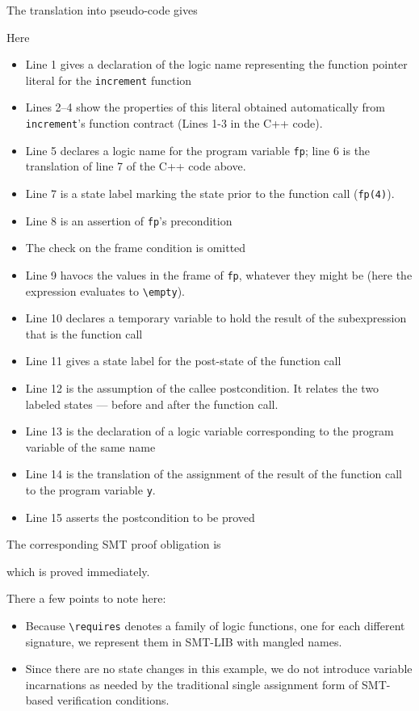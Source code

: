 The translation into pseudo-code gives


Here
\begin{itemize}[noitemsep,nolistsep]
	\item Line 1 gives a declaration of the logic name representing 
	the function pointer literal for the \lstinline|increment| function
	\item Lines 2--4 show the properties of this literal obtained
	automatically from \lstinline|increment|'s function contract
	(Lines 1-3 in the C++ code).
	\item Line 5 declares a logic name for the program variable 
	\lstinline|fp|; line 6 is the translation of line 7 of the C++ code above.
	\item Line 7 is a state label marking the state prior to the 
	function call (\lstinline|fp(4)|).
	\item Line 8 is an assertion of \lstinline|fp|'s precondition
	\item The check on the frame condition is omitted
	\item Line 9 havocs the values in the frame of \lstinline|fp|,
	whatever they might be (here the expression evaluates to 
	\lstinline|\empty|).
	\item Line 10 declares a temporary variable to hold the result of
	the subexpression that is the function call
	\item Line 11 gives a state label for the post-state of the function call
	\item Line 12 is the assumption of the callee postcondition. It relates the two labeled states --- before and after the function call.
	\item Line 13 is the declaration of a logic variable corresponding 
	to the program variable of the same name
	\item Line 14 is the translation of the assignment of the result of
	the function call to the program variable \lstinline|y|.
	\item Line 15 asserts the postcondition to be proved
\end{itemize}

The corresponding SMT proof obligation is

which is proved immediately.

There a few points to note here:
\begin{itemize}
	\item Because \lstinline|\requires| denotes a family of logic functions, one for each different signature, we represent them in SMT-LIB with mangled names.
	\item Since there are no state changes in this example, we do not introduce variable incarnations as needed by the traditional 
	single assignment form of SMT-based verification conditions.
\end{itemize}

